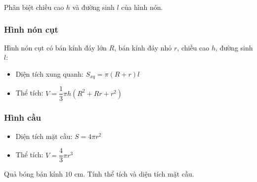 \documentclass[12pt,a4paper]{article}
\begin{document}
\begin{luuy}
  Phân biệt chiều cao $h$ và đường sinh $l$ của hình nón.
\end{luuy}

\subsubsection{Hình nón cụt}

\begin{congthuc}
  Hình nón cụt có bán kính đáy lớn $R$, bán kính đáy nhỏ $r$, chiều cao $h$, đường sinh $l$:
  \begin{itemize}
    \item Diện tích xung quanh: $S_{xq} = \pi(R + r) l$
    \item Thể tích: $V = \dfrac{1}{3}\pi h(R^2 + Rr + r^2)$
  \end{itemize}
\end{congthuc}

\subsubsection{Hình cầu}

\begin{congthuc}
  \begin{itemize}
    \item Diện tích mặt cầu: $S = 4\pi r^2$
    \item Thể tích: $V = \dfrac{4}{3}\pi r^3$
  \end{itemize}
\end{congthuc}

\begin{vidu}
  Quả bóng bán kính $10$ cm. Tính thể tích và diện tích mặt cầu.
\end{vidu}
\end{document}

